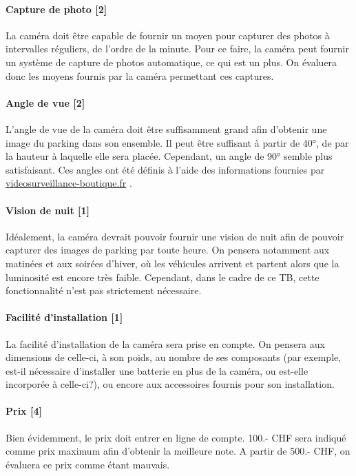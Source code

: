 \paragraph{Capture de photo [2]}
La caméra doit être capable de fournir un moyen pour capturer des photos à intervalles réguliers, de l'ordre de la minute. Pour ce faire, la caméra peut fournir un système de capture de photos automatique, ce qui est un plus. On évaluera donc les moyens fournis par la caméra permettant ces captures.

\paragraph{Angle de vue [2]}
L'angle de vue de la caméra doit être suffisamment grand afin d'obtenir une image du parking dans son ensemble. Il peut être suffisant à partir de 40°, de par la hauteur à laquelle elle sera placée. Cependant, un angle de 90° semble plus satisfaisant. Ces angles ont été définis à l'aide des informations fournies par \url{videosurveillance-boutique.fr} \autocite{cam:securite_info}.

\paragraph{Vision de nuit [1]}
Idéalement, la caméra devrait pouvoir fournir une vision de nuit afin de pouvoir capturer des images de parking par toute heure. On pensera notamment aux matinées et aux soirées d'hiver, où les véhicules arrivent et partent alors que la luminosité est encore très faible. Cependant, dans le cadre de ce TB, cette fonctionnalité n'est pas strictement nécessaire.

\paragraph{Facilité d'installation [1]}
La facilité d'installation de la caméra sera prise en compte. On pensera aux dimensions de celle-ci, à son poids, au nombre de ses composants (par exemple, est-il nécessaire d'installer une batterie en plus de la caméra, ou est-elle incorporée à celle-ci?), ou encore aux accessoires fournis pour son installation. 

\paragraph{Prix [4]} Bien évidemment, le prix doit entrer en ligne de compte. 100.- CHF sera indiqué comme prix maximum afin d'obtenir la meilleure note. A partir de 500.- CHF, on évaluera ce prix comme étant mauvais.

